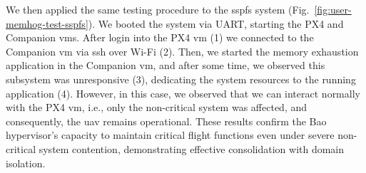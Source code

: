We then applied the same testing procedure to the \gls{sspfs} system
(Fig.~\ref{fig:user-memhog-test-sspfs}). We booted the system via UART, starting
the PX4 and Companion \glspl{vm}. After login into the PX4 \gls{vm} (1) we  
connected to the Companion \gls{vm} via \gls{ssh} over Wi-Fi (2). Then, we
started the memory exhaustion application in the Companion \gls{vm}, and after
some time, we observed this subsystem was unresponsive (3), dedicating the
system resources to the running application (4). However, in this case, we
observed that we can interact normally with the PX4 \gls{vm}, i.e., only the
non-critical system was affected, and consequently, the \gls{uav} remains operational.
%
These results confirm the Bao hypervisor's capacity to maintain critical flight
functions even under severe non-critical system contention, demonstrating
effective consolidation with domain isolation.

